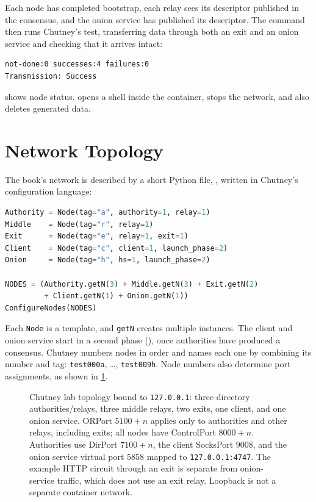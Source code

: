 Each node has completed bootstrap, each relay sees its descriptor published in the consensus, and the onion service has published its descriptor. The  command then runs Chutney's test, transferring data through both an exit and an onion service and checking that it arrives intact:
\begin{lstlisting}[numbers=none]
  not-done:0 successes:4 failures:0
Transmission: Success
\end{lstlisting}

 shows node status.  opens a shell inside the container,  stops the network, and  also deletes generated data.

\section{Network Topology}\label{sec:rp-topologia}

The book's network is described by a short Python file, , written in Chutney's configuration language:
\begin{lstlisting}[language=Python]
Authority = Node(tag="a", authority=1, relay=1)
Middle    = Node(tag="r", relay=1)
Exit      = Node(tag="e", relay=1, exit=1)
Client    = Node(tag="c", client=1, launch_phase=2)
Onion     = Node(tag="h", hs=1, launch_phase=2)

NODES = (Authority.getN(3) + Middle.getN(3) + Exit.getN(2)
         + Client.getN(1) + Onion.getN(1))
ConfigureNodes(NODES)
\end{lstlisting}

Each \texttt{Node} is a template, and \texttt{getN} creates multiple instances. The client and onion service start in a second phase (), once authorities have produced a consensus. Chutney numbers nodes in order and names each one by combining its number and tag: \texttt{test000a}, \ldots, \texttt{test009h}. Node numbers also determine port assignments, as shown in \cref{fig:rete-privata}.

\begin{figure}[htbp]
\centering

\caption{Chutney lab topology bound to \texttt{127.0.0.1}: three directory authorities/relays, three middle relays, two exits, one client, and one onion service. ORPort $5100+n$ applies only to authorities and other relays, including exits; all nodes have ControlPort $8000+n$. Authorities use DirPort $7100+n$, the client SocksPort $9008$, and the onion service virtual port $5858$ mapped to \texttt{127.0.0.1:4747}. The example HTTP circuit through an exit is separate from onion-service traffic, which does not use an exit relay. Loopback is not a separate container network.}
\label{fig:rete-privata}
\end{figure}

